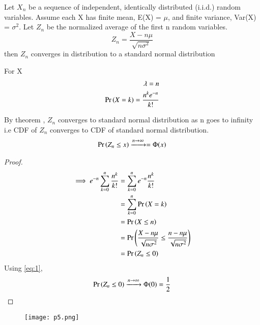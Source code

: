 \documentclass[journal,12pt,twocolumn]{IEEEtran}
\begin{document}
\begin{theorem}
Let $X_n$ be a sequence of independent, identically distributed (i.i.d.) random variables. Assume each X has finite mean, E(X) = $\mu$, and finite variance, Var(X) = $\sigma^2$. Let $Z_n$ be the normalized average of the first n random variables.
\begin{equation}
     Z_n = \frac{X - n \mu}{\sqrt{n \sigma^2}}
\end{equation}
 then $Z_n$ converges in distribution to a standard normal distribution
\end{theorem}
For X 
\begin{align}
    \lambda = n \\
    \Pr\left(X = k\right) = \frac{n^k e^{-n}}{k!}
\end{align}
\begin{corollary}
By theorem , $Z_n$ converges to standard normal distribution as n goes to infinity i.e CDF of $Z_n$ converges to CDF of standard normal distribution.
\begin{align}
    \Pr\left(Z_n \leq x\right) \xrightarrow{ n \rightarrow \infty} = \Phi(x) \label{eq:1}
\end{align}
\end{corollary}
\begin{proof}
\begin{align}
\implies e^{-n} \sum_{k=0}^{n} \frac{n^k}{k!} & = \sum_{k = 0}^{n} e^{-n}  \frac{n^k}{k!} \\
& = \sum_{k = 0}^{n} \Pr\left(X=k\right) \\
& = \Pr\left(X \leq n\right) \\
& = \Pr\left( \frac{X - n \mu}{\sqrt{n \sigma^2}} \leq \frac{n - n \mu}{\sqrt{n \sigma^2}}\right) \\
& = \Pr\left(Z_n \leq 0\right)
\end{align}
Using \eqref{eq:1},
\begin{align}
\Pr\left( Z_n \leq 0\right) \xrightarrow{n \rightarrow \infty} \Phi(0)
 = \frac{1}{2}
\end{align}
\end{proof}

\begin{figure}
    \texttt{[image: p5.png]}
    \label{fig:1}
\end{figure}
\end{document}
